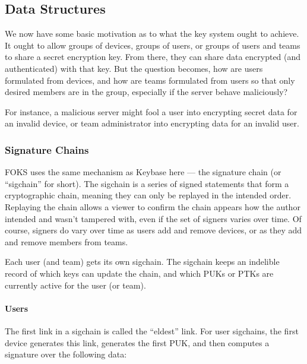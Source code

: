 \subsection{Data Structures}

We now have some basic motivation as to what the key system ought to achieve.
It ought to allow groups of devices, groups of users, or groups of users
and teams to share a secret encryption key. From there, they can share data
encrypted (and authenticated) with that key. But the question becomes,
how are users formulated from devices, and how are teams formulated from users
so that only desired members are in the group, especially if the server
behave maliciously?

For instance, a malicious server might fool a user into encrypting secret data
for an invalid device, or team administrator into encrypting data for an invalid
user.

\subsubsection{Signature Chains}
\label{sec:sigchains}

FOKS uses the same mechanism as Keybase here --- the signature chain (or
``sigchain'' for short).  The sigchain is a series of signed statements that
form a cryptographic chain, meaning they can only be replayed in the intended
order. Replaying the chain allows a viewer to confirm the chain appears how the
author intended and wasn't tampered with, even if the set of signers varies over
time. Of course, signers do vary over time as users add and remove devices, or
as they add and remove members from teams.

Each user (and team) gets its own sigchain. The sigchain keeps an indelible record
of which keys can update the chain, and which PUKs or PTKs are currently
active for the user (or team).

\paragraph{Users} The first link in a sigchain is called the ``eldest'' link. For user sigchains,
the first device generates this link, generates the first PUK, and then computes
a signature over the following data:

